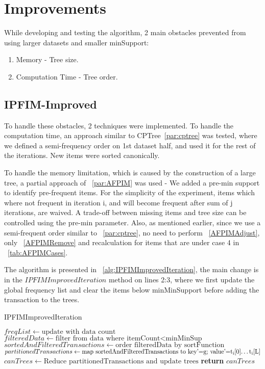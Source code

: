 
\section{Improvements}
\label{sec:improvements}

While developing and testing the algorithm, 2 main obstacles prevented from using larger datasets and smaller minSupport:
\begin{enumerate}
	\item Memory - Tree size.
	\item Computation Time - Tree order.
\end{enumerate}

\subsection{IPFIM-Improved}
To handle these obstacles, 2 techniques were implemented.
To handle the computation time, an approach similar to CPTree~\ref{par:cptree} was tested, where we defined a semi-frequency order on 1st dataset half, and used it for the rest of the iterations. New items were sorted canonically.

To handle the memory limitation, which is caused by the construction of a large tree, a partial approach of ~\ref{par:AFPIM} was used - We added a pre-min support to identify pre-frequent items. For the simplicity of the experiment, items which where not frequent in iteration i, and will become frequent after sum of j iterations, are waived. A trade-off between missing items and tree size can be controlled using the pre-min parameter.  Also, as mentioned earlier, since we use a semi-frequent order similar to ~\ref{par:cptree}, no need to perform ~\ref{AFPIMAdjust}, only ~\ref{AFPIMRemove} and recalculation for items that are under case 4 in ~\ref{tab:AFPIMCases}.

The algorithm is presented in ~\autoref{alg:IPFIMImprovedIteration}, the main change is in the $IPFIMImprovedIteration$ method on lines 2:3, where we first update the global frequency list and clear the items below minMinSupport before adding the transaction to the trees.

\begin{algorithm}
  \caption{IPFIMImprovedIteration}
  \begin{algorithmic}[1]
   \label{alg:IPFIMImprovedIteration}
    \State $freqList\gets\text{update with data count}$
    \State $filteredData\gets\text{filter from data where itemCount<minMinSup }$
    \State $sortedAndFilteredTransactions\gets\text{order filteredData by sortFunction}$
    \State $partitionedTransactions\gets\text{map sortedAndFilteredTransactions to key'=g; value'={t\textsubscript{i}[0]…t\textsubscript{i}[L]}}$ 
	\State $canTrees \gets\text{Reduce partitionedTransactions and update trees}$
	\State \textbf{return} $canTrees$
    \EndProcedure
  \end{algorithmic}
\end{algorithm}


